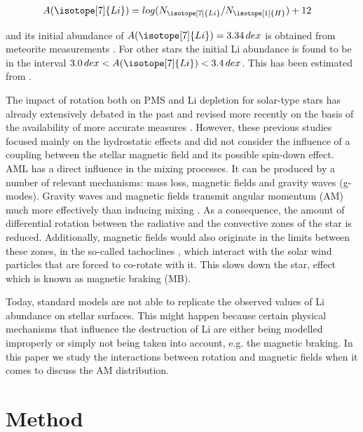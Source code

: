 \documentclass[fleqn,usenatbib]{mnras}
\begin{document}
\begin{ceqn}
\begin{align}
    A(\isotope[7]{Li}) &= log(N_{\isotope[7]{Li}} / N_{\isotope[1]{H}}) + 12
    \label{eq:A_Li}
\end{align}
\end{ceqn}

and its initial abundance of $A(\isotope[7]{Li}) = 3.34 \, dex$ is obtained from meteorite measurements \citep{Randich2006}. For other stars the initial Li abundance is found to be in the interval $3.0 \, dex < A(\isotope[7]{Li}) < 3.4 \, dex$. This has been estimated from  \citet{Randich2006}.\par

The impact of rotation both on PMS and Li depletion for solar-type stars has already extensively debated in the past \citep{Pinsonneault1997,Jeffries2004,Somers2014} and revised more recently on the basis of the availability of more accurate measures \citep{Bouvier2016}. However, these previous studies focused mainly on the hydrostatic effects and did not consider the influence of a coupling between the stellar magnetic field and its possible spin-down effect. AML has a direct influence in the mixing processes. It can be produced by a number of relevant mechanisms: mass loss, magnetic fields and gravity waves (g-modes). Gravity waves \citep{Charbonnel2005} and magnetic fields \citep{Eggenberger2009} transmit angular momentum (AM) much more effectively than inducing mixing \citep{Denissenkov2007}. As a consequence, the amount of differential rotation between the radiative and the convective zones of the star is reduced. Additionally, magnetic fields would also originate in the limits between these zones, in the so-called tachoclines \citep{Aschwanden2014, Guerrero2016}, which interact with the solar wind particles that are forced to co-rotate with it. This slows down the star, effect which is known as magnetic braking (MB). \par

Today, standard models are not able to replicate the observed values of Li abundance on stellar surfaces. This might happen because certain physical mechanisms that influence the destruction of Li are either being modelled improperly or simply not being taken into account, e.g. the magnetic braking. In this paper we study the interactions between rotation and magnetic fields when it comes to discuss the AM distribution. \par

\section{Method} \label{sec_method}
\end{document}
